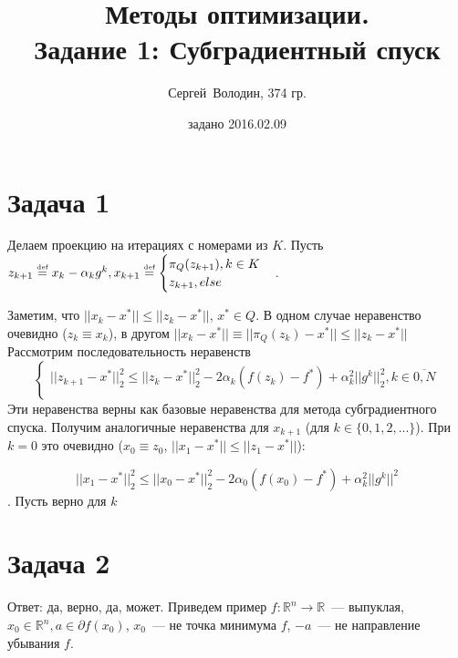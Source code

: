 \documentclass[a4paper]{article}
\title{Методы оптимизации.\\Задание 1: Субградиентный спуск}
\date{задано 2016.02.09}
\author{Сергей~Володин, 374 гр.}
\def\eqdef{\overset{\mbox{\tiny def}}{=}}
\begin{document}
\maketitle
\section*{Задача 1}
Делаем проекцию на итерациях с номерами из $K$. Пусть $z_{k+1}\eqdef x_k-\alpha_kg^k, x_{k+1}\eqdef\begin{cases}
\pi_Q(z_{k+1}), k\in K\\
z_{k+1}, else
\end{cases}$.

Заметим, что $||x_k-x^*||\leqslant||z_k-x^*||$, $x^*\in Q$. В одном случае неравенство очевидно ($z_k\equiv x_k$), в другом $||x_k-x^*||\equiv||\pi_Q(z_k)-x^*||\leqslant ||z_k-x^*||$
Рассмотрим последовательность неравенств $$\begin{cases}
||z_{k+1}-x^*||_2^2\leqslant||z_k-x^*||_2^2-2\alpha_k(f(z_k)-f^*)+\alpha_k^2||g^k||_2^2, k\in\overline{0,N} \\
\end{cases}$$
Эти неравенства верны как базовые неравенства для метода субградиентного спуска.
Получим аналогичные неравенства для $x_{k+1}$ (для $k\in\{0,1,2,...\}$). При $k=0$ это очевидно ($x_0\equiv z_0$, $||x_1-x^*||\leqslant||z_1-x^*||$):

$$||x_1-x^*||_2^2\leqslant||x_0-x^*||_2^2-2\alpha_0(f(x_0)-f^*)+\alpha_k^2||g^k||^2$$. Пусть верно для $k$
\section*{Задача 2}
Ответ: да, верно, да, может. Приведем пример $f\colon \mathbb{R}^n\to\mathbb{R}$~--- выпуклая, $x_0\in\mathbb{R}^n, a\in\partial f(x_0)$, $x_0$~--- не точка минимума $f$, $-a$~--- не направление убывания $f$.
\end{document}
